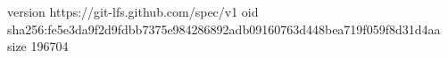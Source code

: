 version https://git-lfs.github.com/spec/v1
oid sha256:fe5e3da9f2d9fdbb7375e984286892adb09160763d448bea719f059f8d31d4aa
size 196704
